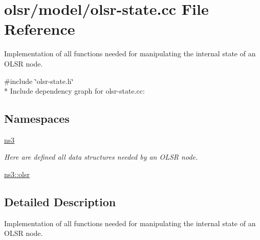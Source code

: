 \hypertarget{olsr-state_8cc}{}\section{olsr/model/olsr-\/state.cc File Reference}
\label{olsr-state_8cc}


Implementation of all functions needed for manipulating the internal state of an O\+L\+SR node.  


{\ttfamily \#include \char`\"{}olsr-\/state.\+h\char`\"{}}\\*
Include dependency graph for olsr-\/state.cc\+:
\subsection*{Namespaces}
\begin{DoxyCompactItemize}
\item 
 \hyperlink{namespacens3}{ns3}
\begin{DoxyCompactList}\small\item\em Here are defined all data structures needed by an O\+L\+SR node. \end{DoxyCompactList}\item 
 \hyperlink{namespacens3_1_1olsr}{ns3\+::olsr}
\end{DoxyCompactItemize}


\subsection{Detailed Description}
Implementation of all functions needed for manipulating the internal state of an O\+L\+SR node. 

